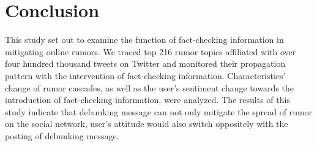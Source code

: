 \documentclass[conference]{IEEEtran}
\begin{document}
	
	\section{Conclusion}
	This study set out to examine the function of fact-checking information in mitigating online rumors. We traced top 216 rumor topics affiliated with over four hundred thousand tweets on Twitter and monitored their propagation pattern with the intervention of fact-checking information. Characteristics' change of rumor cascades, as well as the user's sentiment change towards the introduction of fact-checking information, were analyzed. The results of this study indicate that debunking message can not only mitigate the spread of rumor on the social network, user's attitude would also switch oppositely with the posting of debunking message. 
	
	
	
	
	
	
	
\end{document}
